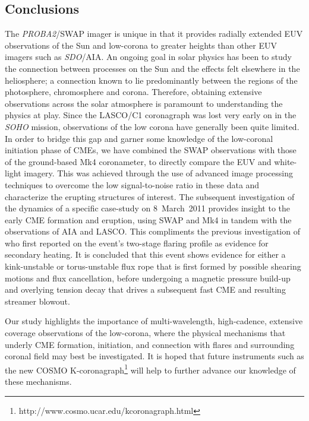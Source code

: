 \documentclass[namedreferences]{solarphysics}
\begin{document}
\begin{article}
\section{Conclusions}
\label{sect:conclusions}

The \emph{PROBA2}/SWAP imager is unique in that it provides radially extended EUV observations of the Sun and low-corona to greater heights than other EUV imagers such as \emph{SDO}/AIA. An ongoing goal in solar physics has been to study the connection between processes on the Sun and the effects felt elsewhere in the heliosphere; a connection known to lie predominantly between the regions of the photosphere, chromosphere and corona. Therefore, obtaining extensive observations across the solar atmosphere is paramount to understanding the physics at play. Since the LASCO/C1 coronagraph was lost very early on in the \emph{SOHO} mission, observations of the low corona have generally been quite limited. In order to bridge this gap and garner some knowledge of the low-coronal initiation phase of CMEs, we have combined the SWAP observations with those of the ground-based Mk4 coronameter, to directly compare the EUV and white-light imagery. This was achieved through the use of advanced image processing techniques to overcome the low signal-to-noise ratio in these data and characterize the erupting structures of interest. The subsequent investigation of the dynamics of a specific case-study on 8~March~2011 provides insight to the early CME formation and eruption, using SWAP and Mk4 in tandem with the observations of AIA and LASCO. This compliments the previous investigation of  who first reported on the event's two-stage flaring profile as evidence for secondary heating. It is concluded that this event shows evidence for either a kink-unstable or torus-unstable flux rope that is first formed by possible shearing motions and flux cancellation, before undergoing a magnetic pressure build-up and overlying tension decay that drives a subsequent fast CME and resulting streamer blowout. 

Our study highlights the importance of multi-wavelength, high-cadence, extensive coverage observations of the low-corona, where the physical mechanisms that underly CME formation, initiation, and connection with flares and surrounding coronal field may best be investigated. It is hoped that future instruments such as the new COSMO K-coronagraph\footnote{http://www.cosmo.ucar.edu/kcoronagraph.html} will help to further advance our knowledge of these mechanisms.



\end{article}
\end{document}
